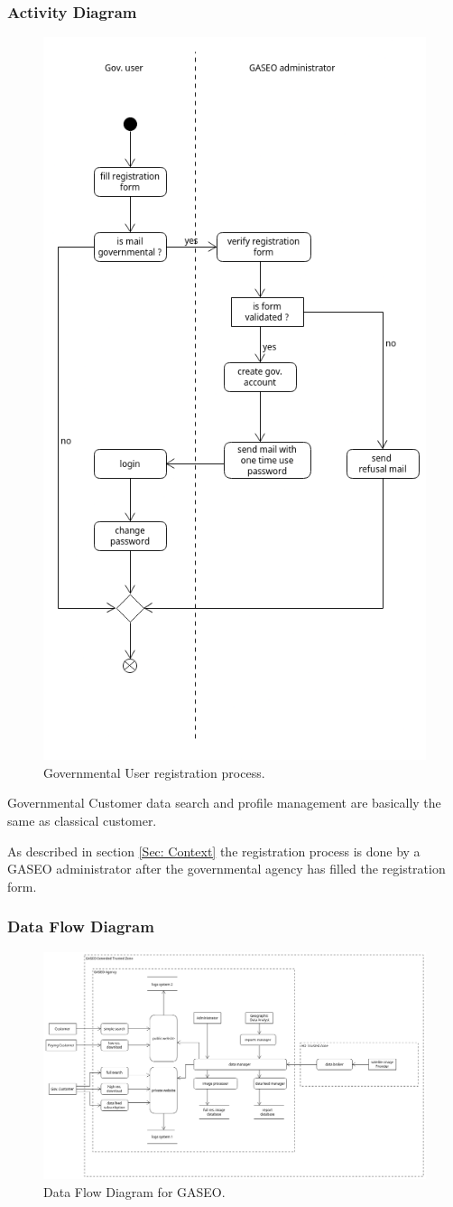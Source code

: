 \documentclass[12pt]{article}
\begin{document}
\subsubsection*{Activity Diagram}
\begin{figure}[h]
    \centering
    \includegraphics[height=0.65\textwidth]{Figures/Business Processes/Activity_4.png}
    \caption{Governmental User registration process.}
\end{figure}

Governmental Customer data search and profile management are basically the same as classical customer. 

As described in section \ref{Sec: Context} the registration process is done by a GASEO administrator after the governmental agency has filled the registration form.

\newpage
\subsubsection*{Data Flow Diagram}
\begin{figure}[h]
    \centering
    \includegraphics[width=\textwidth]{Figures/Business Processes/DataFlow_1.png}
    \caption{Data Flow Diagram for GASEO.}
\end{figure}
\end{document}
